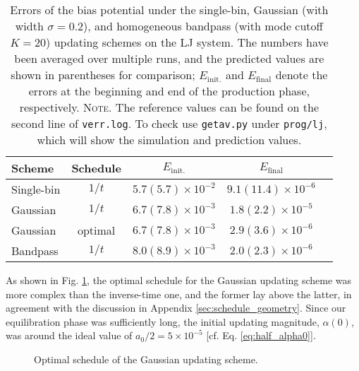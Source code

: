 \documentclass[reprint, superscriptaddress, floatfix]{revtex4-1}
\newcommand{\note}[1]{{\color{DarkGreen}\footnotesize \textsc{Note.} #1}}
\newcommand{\Err}{E}
\begin{document}
\begin{table}[h]
  \caption{\label{tab:lj_error}
    Errors of the bias potential under
    the single-bin,
    Gaussian (with width $\sigma = 0.2$),
    and homogeneous bandpass (with mode cutoff $K = 20$)
    updating schemes
    on the LJ system.
    The numbers have been averaged over multiple runs,
    and the predicted values are shown in parentheses for comparison;
    $\Err_\mathrm{init.}$ and $\Err_\mathrm{final}$
    denote the errors at the beginning and end of the production phase, respectively.
    \note{The reference values can be found
    on the second line of \texttt{verr.log}.
    To check use \texttt{getav.py} under \texttt{prog/lj},
    which will show the simulation and prediction values.}%
  }
  \setlength{\tabcolsep}{2pt}
  \renewcommand\arraystretch{1.4}
  \begin{tabular} { l c c c c }
    \hline
    Scheme & Schedule &
    $\Err_\mathrm{init.}$ &
    $\Err_\mathrm{final}$
    \\
    \hline
    Single-bin & $1/t$
    & $5.7(5.7)\times10^{-2}$
    & $9.1(11.4)\times10^{-6}$
    \\
    Gaussian & $1/t$
    & $6.7(7.8)\times10^{-3}$
    & $1.8(2.2)\times10^{-5}$
    \\
    Gaussian & optimal
    & $6.7(7.8)\times10^{-3}$
    & $2.9(3.6)\times10^{-6}$
    \\
    Bandpass & $1/t$
    & $8.0(8.9)\times10^{-3}$
    & $2.0(2.3)\times10^{-6}$
    \\
    \hline
  \end{tabular}
\end{table}

As shown in Fig. \ref{fig:lj_alpha},
the optimal schedule for the Gaussian updating scheme
was more complex than the inverse-time one,
and the former lay above the latter,
in agreement with the discussion in Appendix \ref{sec:schedule_geometry}.
%
Since our equilibration phase was sufficiently long,
the initial updating magnitude, $\alpha(0)$,
was around the ideal value of $a_0/2 = 5\times10^{-5}$
[cf. Eq. \eqref{eq:half_alpha0}].

\begin{figure}[h]\centering
  \caption{
    \label{fig:lj_alpha}
    Optimal schedule of the Gaussian updating scheme.
  }
\end{figure}
\end{document}

